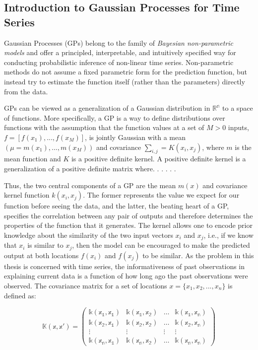 \subsection{Introduction to Gaussian Processes for Time Series}

Gaussian Processes (GPs) belong to the family of \textit{Bayesian non-parametric models} and offer a principled, interpretable, and intuitively specified way for conducting probabilistic inference of non-linear time series. Non-parametric methods do not assume a fixed parametric form for the prediction function, but instead try to estimate the function itself (rather than the parameters) directly from the data. 

GPs can be viewed as a generalization of a Gaussian distribution in $\mathbb{R^n}$ to a space of functions. More specifically, a GP is a way to define distributions over functions with the assumption that the function values at a set of $M > 0$ inputs, $f = [f(x_1), . . .,f(x_M)]$, is jointly Gaussian with a mean $(\mu = m(x_1), . . .,m(x_M))$ and covariance $\sum_{i, j} = K(x_i, x_j)$, where $m$ is the mean function and $K$ is a positive definite kernel. A positive definite kernel is a generalization of a positive definite matrix where. . .  . . . 

Thus, the two central components of a GP are the mean $m(x)$ and covariance kernel function $k(x_i, x_j)$. The former represents the value we expect for our function before seeing the data, and the latter, the beating heart of a GP, specifies the correlation between any pair of outputs and therefore determines the properties of the function that it generates. The kernel allows one to encode prior knowledge about the similarity of the two input vectors $x_i$ and $x_j$, i.e., if we know that $x_i$ is similar to $x_j$, then the model can be encouraged to make the predicted output at both locations $f(x_i)$ and $f(x_j)$ to be similar. As the problem in this thesis is concerned with time series, the informativeness of past observations in explaining current data is a function of how long ago the past observations were observed. The covariance matrix for a set of locations $x = \{x_1, x_2, . . .,x_n\}$ is defined as:

\begin{equation}
\mathbb{K(x, x') = \begin{pmatrix}
k(x_1, x_1) & k(x_1, x_2) & \dots & k(x_1, x_n) \\
k(x_2, x_1) & k(x_2, x_2) & \dots & k(x_2, x_n) \\
\vdots & \vdots & \vdots & \vdots \\
k(x_n, x_1) & k(x_n, x_2) & \dots & k(x_n, x_n)
\end{pmatrix}}
\end{equation}

